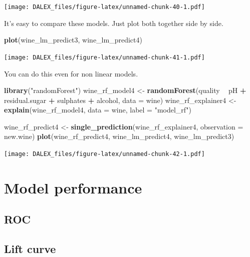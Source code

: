 \documentclass[]{book}
\newenvironment{Shaded}{\begin{snugshade}}{\end{snugshade}}
\newcommand{\KeywordTok}[1]{\textcolor[rgb]{0.13,0.29,0.53}{\textbf{#1}}}
\newcommand{\DataTypeTok}[1]{\textcolor[rgb]{0.13,0.29,0.53}{#1}}
\newcommand{\StringTok}[1]{\textcolor[rgb]{0.31,0.60,0.02}{#1}}
\newcommand{\OperatorTok}[1]{\textcolor[rgb]{0.81,0.36,0.00}{\textbf{#1}}}
\newcommand{\NormalTok}[1]{#1}
\theoremstyle{definition}
\theoremstyle{definition}
\theoremstyle{definition}
\theoremstyle{remark}
\begin{document}
\texttt{[image: DALEX\_files/figure-latex/unnamed-chunk-40-1.pdf]}

It's easy to compare these models. Just plot both together side by side.

\begin{Shaded}
\begin{Highlighting}[]
\KeywordTok{plot}\NormalTok{(wine_lm_predict3, wine_lm_predict4)}
\end{Highlighting}
\end{Shaded}

\texttt{[image: DALEX\_files/figure-latex/unnamed-chunk-41-1.pdf]}

You can do this even for non linear models.

\begin{Shaded}
\begin{Highlighting}[]
\KeywordTok{library}\NormalTok{(}\StringTok{"randomForest"}\NormalTok{)}
\NormalTok{wine_rf_model4 <-}\StringTok{ }\KeywordTok{randomForest}\NormalTok{(quality }\OperatorTok{~}\StringTok{ }\NormalTok{pH }\OperatorTok{+}\StringTok{ }\NormalTok{residual.sugar }\OperatorTok{+}\StringTok{ }\NormalTok{sulphates }\OperatorTok{+}\StringTok{ }\NormalTok{alcohol, }\DataTypeTok{data =}\NormalTok{ wine)}
\NormalTok{wine_rf_explainer4 <-}\StringTok{ }\KeywordTok{explain}\NormalTok{(wine_rf_model4, }\DataTypeTok{data =}\NormalTok{ wine, }\DataTypeTok{label =} \StringTok{"model_rf"}\NormalTok{)}

\NormalTok{wine_rf_predict4 <-}\StringTok{ }\KeywordTok{single_prediction}\NormalTok{(wine_rf_explainer4, }\DataTypeTok{observation =}\NormalTok{ new.wine)}
\KeywordTok{plot}\NormalTok{(wine_rf_predict4, wine_lm_predict4, wine_lm_predict3)}
\end{Highlighting}
\end{Shaded}

\texttt{[image: DALEX\_files/figure-latex/unnamed-chunk-42-1.pdf]}

\chapter{Model performance}\label{model-performance}

\section{ROC}\label{roc}

\section{Lift curve}\label{lift-curve}
\end{document}
